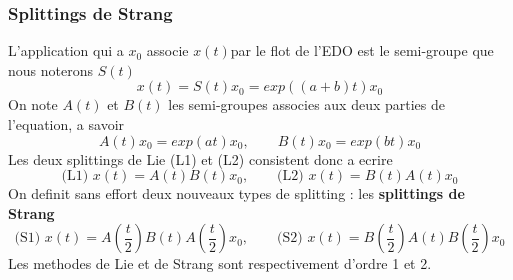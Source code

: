 \subsubsection{Splittings de Strang}
L’application qui a $x_0$ associe $x(t)$par le flot de l’EDO est le semi-groupe que nous noterons $S(t)$
\begin{equation}
x(t)=S(t)x_0=exp((a+b)t)x_0
\end{equation}
On note $A(t)$ et $B(t)$ les semi-groupes associes aux deux parties de l’equation, a savoir
$$
A(t)x_0=exp(at)x_0, \quad \quad B(t)x_0=exp(bt)x_0
$$
Les deux splittings de Lie (L1) et (L2) consistent donc a ecrire
$$
\mbox{(L1) } x(t)=A(t)B(t)x_0, \quad \quad \mbox{(L2) } x(t)=B(t)A(t)x_0
$$
On definit sans effort deux nouveaux types de splitting : les \textbf{splittings de Strang} \cite{Strang}
$$
\mbox{(S1) } x(t)=A(\dfrac{t}{2})B(t)A(\dfrac{t}{2})x_0, \quad \quad \mbox{(S2) } x(t)=B(\dfrac{t}{2})A(t)B(\dfrac{t}{2})x_0
$$
Les methodes de Lie et de Strang sont respectivement d’ordre 1 et 2.
